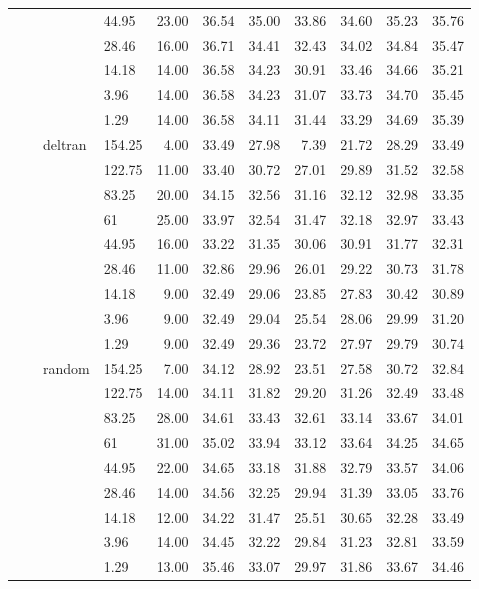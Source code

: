 \begin{longtable}{llllrrrrrrr}
   &  &  & 44.95 & 23.00 & 36.54 & 35.00 & 33.86 & 34.60 & 35.23 & 35.76 \\ 
   &  &  & 28.46 & 16.00 & 36.71 & 34.41 & 32.43 & 34.02 & 34.84 & 35.47 \\ 
   &  &  & 14.18 & 14.00 & 36.58 & 34.23 & 30.91 & 33.46 & 34.66 & 35.21 \\ 
   &  &  & 3.96 & 14.00 & 36.58 & 34.23 & 31.07 & 33.73 & 34.70 & 35.45 \\ 
   &  &  & 1.29 & 14.00 & 36.58 & 34.11 & 31.44 & 33.29 & 34.69 & 35.39 \\ 
   &  & deltran & 154.25 & 4.00 & 33.49 & 27.98 & 7.39 & 21.72 & 28.29 & 33.49 \\ 
   &  &  & 122.75 & 11.00 & 33.40 & 30.72 & 27.01 & 29.89 & 31.52 & 32.58 \\ 
   &  &  & 83.25 & 20.00 & 34.15 & 32.56 & 31.16 & 32.12 & 32.98 & 33.35 \\ 
   &  &  & 61 & 25.00 & 33.97 & 32.54 & 31.47 & 32.18 & 32.97 & 33.43 \\ 
   &  &  & 44.95 & 16.00 & 33.22 & 31.35 & 30.06 & 30.91 & 31.77 & 32.31 \\ 
   &  &  & 28.46 & 11.00 & 32.86 & 29.96 & 26.01 & 29.22 & 30.73 & 31.78 \\ 
   &  &  & 14.18 & 9.00 & 32.49 & 29.06 & 23.85 & 27.83 & 30.42 & 30.89 \\ 
   &  &  & 3.96 & 9.00 & 32.49 & 29.04 & 25.54 & 28.06 & 29.99 & 31.20 \\ 
   &  &  & 1.29 & 9.00 & 32.49 & 29.36 & 23.72 & 27.97 & 29.79 & 30.74 \\ 
   &  & random & 154.25 & 7.00 & 34.12 & 28.92 & 23.51 & 27.58 & 30.72 & 32.84 \\ 
   &  &  & 122.75 & 14.00 & 34.11 & 31.82 & 29.20 & 31.26 & 32.49 & 33.48 \\ 
   &  &  & 83.25 & 28.00 & 34.61 & 33.43 & 32.61 & 33.14 & 33.67 & 34.01 \\ 
   &  &  & 61 & 31.00 & 35.02 & 33.94 & 33.12 & 33.64 & 34.25 & 34.65 \\ 
   &  &  & 44.95 & 22.00 & 34.65 & 33.18 & 31.88 & 32.79 & 33.57 & 34.06 \\ 
   &  &  & 28.46 & 14.00 & 34.56 & 32.25 & 29.94 & 31.39 & 33.05 & 33.76 \\ 
   &  &  & 14.18 & 12.00 & 34.22 & 31.47 & 25.51 & 30.65 & 32.28 & 33.49 \\ 
   &  &  & 3.96 & 14.00 & 34.45 & 32.22 & 29.84 & 31.23 & 32.81 & 33.59 \\ 
   &  &  & 1.29 & 13.00 & 35.46 & 33.07 & 29.97 & 31.86 & 33.67 & 34.46 \\ 

\end{longtable}
